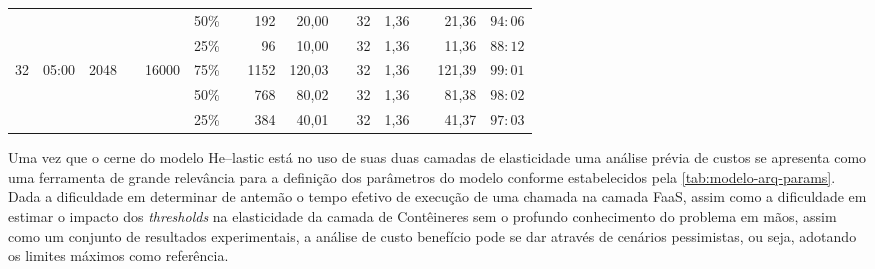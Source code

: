 \documentclass[english,brazilian]{UNISINOSmonografia} %
\begin{document}
\begin{table}
\begin{minipage}{\textwidth}
\begin{tabular*}{\textwidth}{@{\extracolsep{\fill}}rrrlrclrrlrrlrc@{}}
&  &  &  &  & 50\% &  & 192 & 20,00 &  & 32 & 1,36 &  & 21,36 & $94:06$ \\
&  &  &  &  & 25\% &  & 96 & 10,00 &  & 32 & 1,36 &  & 11,36 & $88:12$ \\
\cmidrule(l){6-15} 
\multirow{3}{*}{32} & \multirow{3}{*}{05:00} & \multirow{3}{*}{2048} &  & \multirow{3}{*}{16000} & 75\% &  & 1152 & 120,03 &  & 32 & 1,36 &  & 121,39 & $99:01$ \\
&  &  &  &  & 50\% &  & 768 & 80,02 &  & 32 & 1,36 &  & 81,38 & $98:02$ \\
&  &  &  &  & 25\% &  & 384 & 40,01 &  & 32 & 1,36 &  & 41,37 & $97:03$ \\
\bottomrule
		\end{tabular*}
	\end{minipage}
\end{table}


Uma vez que o cerne do modelo \textsf{He}--lastic está no uso de suas duas camadas de elasticidade uma análise prévia de custos se apresenta como uma ferramenta de grande relevância para a definição dos parâmetros do modelo conforme estabelecidos pela \autoref{tab:modelo-arq-params}.
Dada a dificuldade em determinar de antemão o tempo efetivo de execução de uma chamada na camada FaaS, assim como a dificuldade em estimar o impacto dos \textit{thresholds} na elasticidade da camada de Contêineres sem o profundo conhecimento do problema em mãos, assim como um conjunto de resultados experimentais, a análise de custo benefício pode se dar através de cenários pessimistas, ou seja, adotando os limites máximos como referência.
\end{document}
